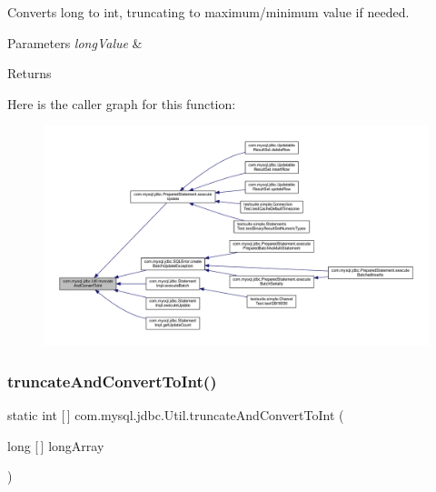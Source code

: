 Converts long to int, truncating to maximum/minimum value if needed.


\begin{DoxyParams}{Parameters}
{\em long\+Value} & \\
\hline
\end{DoxyParams}
\begin{DoxyReturn}{Returns}

\end{DoxyReturn}
Here is the caller graph for this function\+:
\nopagebreak
\begin{figure}[H]
\begin{center}
\leavevmode
\includegraphics[width=350pt]{classcom_1_1mysql_1_1jdbc_1_1_util_ab73dd640e4fb69c157001303d7be0164_icgraph}
\end{center}
\end{figure}
\mbox{\label{classcom_1_1mysql_1_1jdbc_1_1_util_aa422ec3d75ddc371d540e31156472513}} 
\subsubsection{\texorpdfstring{truncate\+And\+Convert\+To\+Int()}{truncateAndConvertToInt()}\hspace{0.1cm}{\footnotesize\ttfamily [2/2]}}
{\footnotesize\ttfamily static int \mbox{[}$\,$\mbox{]} com.\+mysql.\+jdbc.\+Util.\+truncate\+And\+Convert\+To\+Int (\begin{DoxyParamCaption}\item[{long \mbox{[}$\,$\mbox{]}}]{long\+Array }\end{DoxyParamCaption})\hspace{0.3cm}{\ttfamily [static]}}

